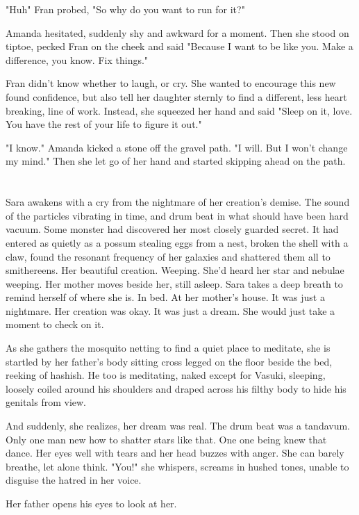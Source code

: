 \documentclass{article}
\begin{document}
"Huh" Fran probed, "So why do you want to run for it?"

Amanda hesitated, suddenly shy and awkward for a moment. Then she stood on tiptoe, pecked Fran on the cheek and said "Because I want to be like you. Make a difference, you know. Fix things."

Fran didn't know whether to laugh, or cry. She wanted to encourage this new found confidence, but also tell her daughter sternly to find a different, less heart breaking, line of work. Instead, she squeezed her hand and said "Sleep on it, love. You have the rest of your life to figure it out."

"I know." Amanda kicked a stone off the gravel path. "I will. But I won't change my mind." Then she let go of her hand and started skipping ahead on the path.

\section{}
Sara awakens with a cry from the nightmare of her creation's demise. The sound of the particles vibrating in time, and drum beat in what should have been hard vacuum. Some monster had discovered her most closely guarded secret. It had entered as quietly as a possum stealing eggs from a nest, broken the shell with a claw, found the resonant frequency of her galaxies and shattered them all to smithereens. Her beautiful creation. Weeping. She'd heard her star and nebulae weeping. Her mother moves beside her, still asleep. Sara takes a deep breath to remind herself of where she is. In bed. At her mother's house. It was just a nightmare. Her creation was okay. It was just a dream. She would just take a moment to check on it. 

As she gathers the mosquito netting to find a quiet place to meditate, she is startled by her father's body sitting cross legged on the floor beside the bed, reeking of hashish. He too is meditating, naked except for Vasuki, sleeping, loosely coiled around his shoulders and draped across his filthy body to hide his genitals from view.

And suddenly, she realizes, her dream was real. The drum beat was a tandavum. Only one man new how to shatter stars like that. One one being knew that dance. Her eyes well with tears and her head buzzes with anger. She can barely breathe, let alone think. "You!" she whispers, screams in hushed tones, unable to disguise the hatred in her voice.

Her father opens his eyes to look at her.
\end{document}
